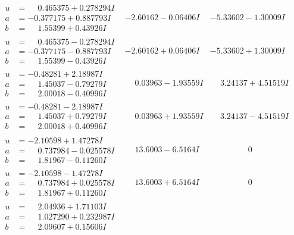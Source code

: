 \documentclass[1p]{elsarticle_modified}
\theoremstyle{definition}
\begin{document}
$$\begin{array}{c|c|c}
\begin{aligned}
u &= \phantom{-}0.465375 + 0.278294 I \\
a &= -0.377175 + 0.887793 I \\
b &= \phantom{-}1.55399 + 0.43926 I\end{aligned}
 & -2.60162 - 0.06406 I & -5.33602 - 1.30009 I \\ \hline\begin{aligned}
u &= \phantom{-}0.465375 - 0.278294 I \\
a &= -0.377175 - 0.887793 I \\
b &= \phantom{-}1.55399 - 0.43926 I\end{aligned}
 & -2.60162 + 0.06406 I & -5.33602 + 1.30009 I \\ \hline\begin{aligned}
u &= -0.48281 + 2.18987 I \\
a &= \phantom{-}1.45037 - 0.79279 I \\
b &= \phantom{-}2.00018 - 0.40996 I\end{aligned}
 & \phantom{-}0.03963 - 1.93559 I & \phantom{-}3.24137 + 4.51519 I \\ \hline\begin{aligned}
u &= -0.48281 - 2.18987 I \\
a &= \phantom{-}1.45037 + 0.79279 I \\
b &= \phantom{-}2.00018 + 0.40996 I\end{aligned}
 & \phantom{-}0.03963 + 1.93559 I & \phantom{-}3.24137 - 4.51519 I \\ \hline\begin{aligned}
u &= -2.10598 + 1.47278 I \\
a &= \phantom{-}0.737984 - 0.025578 I \\
b &= \phantom{-}1.81967 - 0.11260 I\end{aligned}
 & \phantom{-}13.6003 - 6.5164 I & \phantom{-0.000000 } 0 \\ \hline\begin{aligned}
u &= -2.10598 - 1.47278 I \\
a &= \phantom{-}0.737984 + 0.025578 I \\
b &= \phantom{-}1.81967 + 0.11260 I\end{aligned}
 & \phantom{-}13.6003 + 6.5164 I & \phantom{-0.000000 } 0 \\ \hline\begin{aligned}
u &= \phantom{-}2.04936 + 1.71103 I \\
a &= \phantom{-}1.027290 + 0.232987 I \\
b &= \phantom{-}2.09607 + 0.15606 I\end{aligned}

\end{array}$$
\end{document}
